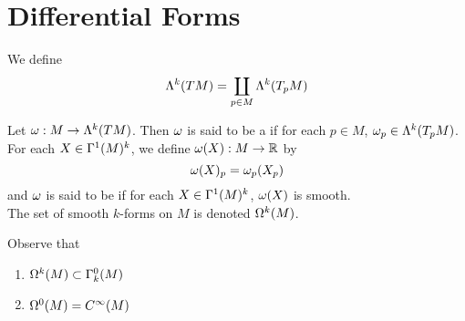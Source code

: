\documentclass{book}
\begin{document}
	\begin{defn}
	
	\end{defn}	
	
	
	
	
	
	
	
	
	
	
	
	
	
	
	
	
	
	
	
	
	
	
	
	
	
	
	
	
	
	
	
	
	
	
	
	
	
	
	
	

	
	\newpage	
	\section{Differential Forms}
	
	\begin{defn}
		We define $$\Lambda^k (TM) = \coprod_{p \in M} \Lambda^k(T_p M)$$
	\end{defn}
	
	\begin{defn}
		Let $\omega: M \rightarrow \Lambda^k (TM)$. Then $\omega$ is said to be a  if for each $p \in M$, $\omega_p \in \Lambda^k(T_pM)$.\\
		For each $X \in \Gamma^1(M)^k$, we define $\omega(X) : M \rightarrow \mathbb{R}$ by $$\omega(X)_p = \omega_p(X_p)$$
		and $\omega$ is said to be  if for each $X \in \Gamma^1(M)^k$, $\omega(X)$ is smooth.\\
		The set of smooth $k$-forms on $M$ is denoted $\Omega^k(M)$.\\
	\end{defn} 

	\begin{note}
		Observe that 
		\begin{enumerate}
		\item $\Omega^k(M) \subset \Gamma^0_k(M)$
		\item $\Omega^0(M) = C^{\infty}(M)$
		\end{enumerate}
	\end{note}
	
\end{document}
